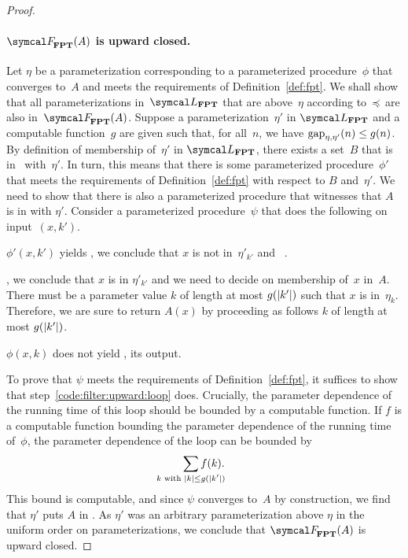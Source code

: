 \begin{proof}
  \paragraph{$\calF_\cl{FPT}(A)$ is upward closed.}
  Let $\eta$ be a parameterization corresponding to a parameterized procedure~$\phi$ that converges to~$A$ and meets the requirements of Definition~\ref{def:fpt}.
  We shall show that all parameterizations in~$\calL_\cl{FPT}$ that are above~$\eta$ according to~$\preccurlyeq$ are also in~$\calF_\cl{FPT}(A)$.
  Suppose a parameterization~$\eta'$ in $\calL_\cl{FPT}$ and a computable function~$g$ are given such that, for all~$n$, we have $\operatorname{gap}_{\eta, \eta'}(n) \le g(n)$.
  By definition of membership of~$\eta'$ in $\calL_\cl{FPT}$, there exists a set~$B$ that is in~ with~$\eta'$.
  In turn, this means that there is some parameterized procedure~$\phi'$ that meets the requirements of Definition~\ref{def:fpt} with respect to $B$ and~$\eta'$.
  We need to show that there is also a parameterized procedure that witnesses that $A$ is in  with $\eta'$.
  Consider a parameterized procedure~$\psi$ that does the following on input~$(x, k')$.
  \begin{codelisting}
  \item
     $\phi'(x, k')$ yields , we conclude that $x$ is not in~$\eta'_{k'}$ and ~.
  \item\label{code:filter:upward:loop}%
    , we conclude that $x$ is in $\eta'_{k'}$ and we need to decide on membership of~$x$ in~$A$.
    There must be a parameter value $k$ of length at most $g(\length{k'})$ such that $x$ is in~$\eta_k$.
    Therefore, we are sure to return $A(x)$ by proceeding as follows  $k$ of length at most $g(\length{k'})$.
    \begin{codelisting}
    \item {} $\phi(x, k)$ does not yield ,  its output.
    \end{codelisting}
  \end{codelisting}

  To prove that $\psi$ meets the requirements of Definition~\ref{def:fpt}, it suffices to show that step~\ref{code:filter:upward:loop} does.
  Crucially, the parameter dependence of the running time of this loop should be bounded by a computable function.
  If $f$ is a computable function bounding the parameter dependence of the running time of~$\phi$, the parameter dependence of the loop can be bounded by
  \begin{equation*}
    \sum_{\mathclap{k\text{ with }\length{k} \le g(\length{k'})}} f(k).
  \end{equation*}
  This bound is computable, and since $\psi$ converges to~$A$ by construction, we find that $\eta'$ puts $A$ in .
  As $\eta'$ was an arbitrary parameterization above $\eta$ in the uniform order on parameterizations, we conclude that $\calF_\cl{FPT}(A)$ is upward closed.


\end{proof}

